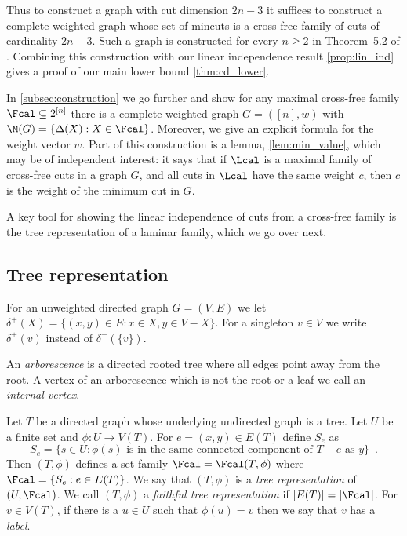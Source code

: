 Thus to construct a graph with cut dimension $2n-3$ it suffices to construct a complete weighted graph whose set of mincuts
is a cross-free family of cuts of cardinality $2n-3$.  Such a graph is constructed for every $n \ge 2$ in Theorem~5.2 of \cite{CR04}.
Combining this construction with our linear independence result \cref{prop:lin_ind} gives a proof of our main lower bound \cref{thm:cd_lower}.


In \cref{subsec:construction} we go further and show for any maximal cross-free family $\Fcal \subseteq 2^{[n]}$ there is a complete weighted graph $G = ([n],w)$
with $\M(G) = \{ \Delta(X) : X \in \Fcal\}$.  Moreover, we give an explicit formula for the weight vector $w$.
Part of this construction is a lemma, \cref{lem:min_value},
which may be of independent interest: it says that if $\Lcal$ is a maximal family of cross-free cuts in a graph $G$, and all cuts in $\Lcal$ have the same weight $c$, then $c$
is the weight of the minimum cut in $G$.

A key tool for showing the linear independence of cuts from a cross-free family is the tree representation of a laminar family, which we go over next.

\subsection{Tree representation}
\begin{definition}
For an unweighted directed graph $G=(V,E)$ we let $\delta^+(X) = \{(x,y) \in E : x \in X, y \in V - X\}$.  For a singleton $v \in V$
we write $\delta^+(v)$ instead of $\delta^+(\{v\})$.
\end{definition}

\begin{definition}[Arborescence]
An \emph{arborescence} is a directed rooted tree where all edges point away from the root.  A vertex of an arborescence which is
not the root or a leaf we call an \emph{internal vertex}.
\end{definition}

\begin{definition}\label{def:tree-repre}
Let $T$ be a directed graph whose underlying undirected graph is a tree.  Let $U$ be a finite set and $\phi: U \rightarrow V(T)$.
For $e = (x,y) \in E(T)$ define $S_e$ as
\[
S_e = \{ s \in U : \phi(s) \mbox{ is in the same connected component of } T - e \mbox{ as } y \} \enspace .
\]
Then $(T,\phi)$ defines a set family $\Fcal = \Fcal(T, \phi)$ where $\Fcal = \{S_e : e \in E(T)\}$.
We say that $(T,\phi)$ is a \emph{tree representation} of $(U, \Fcal)$.
We call $(T,\phi)$ a \emph{faithful tree representation} if $|E(T)| = |\Fcal|$.
For $v \in V(T)$, if there is a $u \in U$ such that $\phi(u) = v$ then we say that $v$ has a \emph{label}.
\end{definition}

